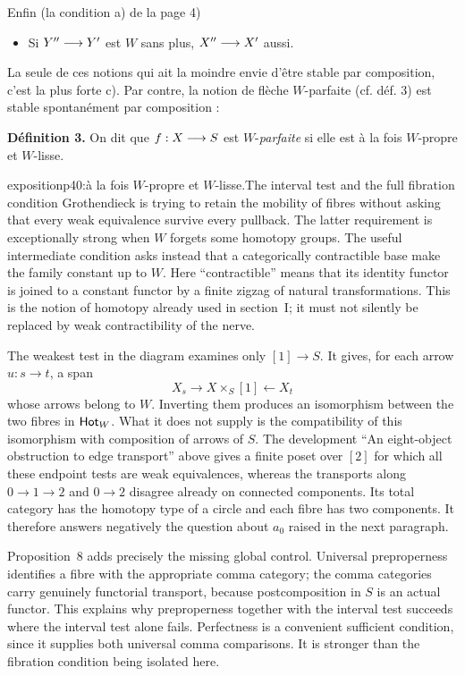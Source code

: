 Enfin (la condition a) de la page 4)

\begin{itemize}
\item[c)] Si $Y''\longrightarrow Y'$ est $W$ sans plus, $X''\longrightarrow X'$ aussi.
\end{itemize}

La seule de ces notions qui ait la moindre envie d'être stable par composition, c'est la plus forte c). Par contre, la notion de flèche $W$-parfaite (cf. déf. 3) est stable spontanément par composition :

\textbf{Définition 3.} On dit que $f : X\longrightarrow S$ est $W$-\textit{parfaite} si elle est à la fois $W$-propre et $W$-lisse.

\begin{dcomment}{exposition}{p40:à la fois $W$-propre et $W$-lisse.}{The interval test and the full fibration condition}
Grothendieck is trying to retain the mobility of fibres without asking that every weak equivalence survive every pullback. The latter requirement is exceptionally strong when $W$ forgets some homotopy groups. The useful intermediate condition asks instead that a categorically contractible base make the family constant up to $W$. Here ``contractible'' means that its identity functor is joined to a constant functor by a finite zigzag of natural transformations. This is the notion of homotopy already used in section~I; it must not silently be replaced by weak contractibility of the nerve.

The weakest test in the diagram examines only $[1]\to S$. It gives, for each arrow $u:s\to t$, a span
\[
 X_s\longrightarrow X\times_S[1]\longleftarrow X_t
\]
whose arrows belong to $W$. Inverting them produces an isomorphism between the two fibres in $\mathsf{Hot}_W$. What it does not supply is the compatibility of this isomorphism with composition of arrows of $S$. The development ``An eight-object obstruction to edge transport'' above gives a finite poset over $[2]$ for which all these endpoint tests are weak equivalences, whereas the transports along $0\to1\to2$ and $0\to2$ disagree already on connected components. Its total category has the homotopy type of a circle and each fibre has two components. It therefore answers negatively the question about $a_0$ raised in the next paragraph.

Proposition~8 adds precisely the missing global control. Universal preproperness identifies a fibre with the appropriate comma category; the comma categories carry genuinely functorial transport, because postcomposition in $S$ is an actual functor. This explains why preproperness together with the interval test succeeds where the interval test alone fails. Perfectness is a convenient sufficient condition, since it supplies both universal comma comparisons. It is stronger than the fibration condition being isolated here.
\end{dcomment}


